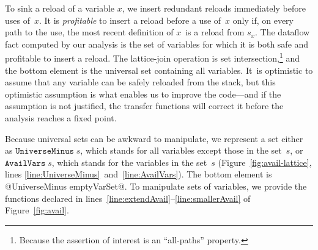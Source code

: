 \documentclass[blockstyle,preprint,natbib,nocopyrightspace]{sigplanconf}
\newcommand\linepairref[2]{lines \ref{line:#1}~and~\ref{line:#2}}
\newcommand\linerangeref[2]{\mbox{lines~\ref{line:#1}--\ref{line:#2}}}
\newcommand\slotof[1]{\ensuremath{s_{#1}}}
\newcommand{\authornote}[1]{{\em #1}}
\def\authornote#1{\unskip\relax}
\newcommand{\simon}[1]{\authornote{SLPJ: #1}}
\newcommand\figref[1]{Figure~\ref{fig:#1}}
\begin{document}
To sink a reload of a variable $x$, we insert redundant reloads immediately
before uses of~$x$.
It is \emph{profitable} to insert a reload before a use of~$x$ only if, 
on every path to the use, the most recent definition of $x$~is a reload from
$\slotof x$.
\simon{I'm confused.  Surely that definition of profitable is also what we
mean by safe?  NR: No---safety could be establish by an arbitrary
assignment to~$x$ followed by a store to $\slotof x$.}
The dataflow fact computed by our analysis is the set of variables for
which it is both 
safe and profitable to insert a reload.
The lattice-join operation is set intersection,\footnote
{Because the assertion of interest is an ``all-paths'' property.}
and the bottom element
is the universal set containing all variables.
It~is optimistic to assume that any variable can be safely reloaded from the stack,
but this optimistic assumption is what enables us to improve the
code---and if the assumption is not justified, the transfer functions
will correct it before
the analysis reaches a fixed point.
\simon{I'm guessing that you intend this sentence to address my long bleat:
``I'm puzzled about why you are treating this example so differently
to constant-prop in Section 3.1.  It looks almost identical to me.  We could
keep a fact for every variable: $x=\bot$ means nothing is known; $x=s_x$ means
x's stack slot is up to date; $x=\top$ means x's stack slot is out of date.
Then keep a finite map as we do for constant prop.  If there is a difference
that drives the rep you have here, let's say so. If the difference is
purely accidental, we should eliminate it.  (Or maybe we don't have time, in
which case we should remark that there is no diff.)''.
For the paper, let's leave it as it is, but this note is to remind us
that I am still unhappy on this point.  I think the difficulty is that we
want to represent \emph{both} the universal set \emph{and} the empty set.
But I'm unclear about the trade-offs in approximation that arise 
from this either-or representation.}



Because universal sets can be awkward to manipulate, we represent a
set either as
$\mathtt{UniverseMinus}\;s$, which stands for all variables except
those in the set~$s$,
or $\mathtt{AvailVars}\;s$, which stands for the variables in the set~$s$
(\figref{avail-lattice}, \linepairref{UniverseMinus}{AvailVars}).
%
%
The bottom element is @UniverseMinus emptyVarSet@.
To manipulate sets of variables, we provide the functions declared in
\linerangeref{extendAvail}{smallerAvail} of \figref{avail}.
\end{document}
